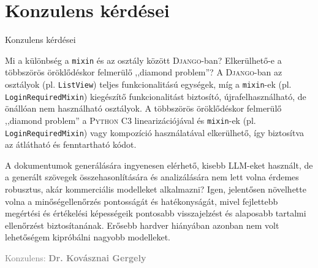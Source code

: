 \documentclass[aspectratio=169, 11pt]{beamer}
\begin{document}
\section{Konzulens kérdései}
\begin{frame}{Konzulens kérdései}
	\begin{block}{\small Mi a különbség a \texttt{mixin} és az osztály között \textsc{Django}-ban?
			Elkerülhető-e a többszörös öröklődéskor felmerülő ,,diamond problem''?}
		\footnotesize A \textsc{Django}-ban az osztályok (pl. \texttt{ListView}) teljes funkcionalitású egységek, míg a \texttt{mixin}-ek (pl. \texttt{LoginRequiredMixin}) kiegészítő funkcionalitást biztosító, újrafelhasználható, de önállóan nem használható osztályok. A többszörös öröklődéskor felmerülő ,,diamond problem'' a \textsc{Python} C3 linearizációjával és \texttt{mixin}-ek (pl. \texttt{LoginRequiredMixin}) vagy kompozíció használatával elkerülhető, így biztosítva az átlátható és fenntartható kódot.
%		
	\end{block}
	\begin{block}{\small A dokumentumok generálására ingyenesen elérhető, kisebb LLM-eket használt, de a generált szövegek összehasonlítására és analizálására nem lett volna érdemes robusztus, akár kommerciális modelleket alkalmazni?}
		\footnotesize Igen, jelentősen növelhette volna a minőségellenőrzés pontosságát és hatékonyságát, mivel fejlettebb megértési és értékelési képességeik pontosabb visszajelzést és alaposabb tartalmi ellenőrzést biztosítanának. Erősebb hardver hiányában azonban nem volt lehetőségem kipróbálni nagyobb modelleket.
	\end{block}
	\vfill
	\hfill \footnotesize\textcolor{gray}{Konzulens: \textbf{Dr. Kovásznai Gergely}}
\end{frame}
\end{document}
